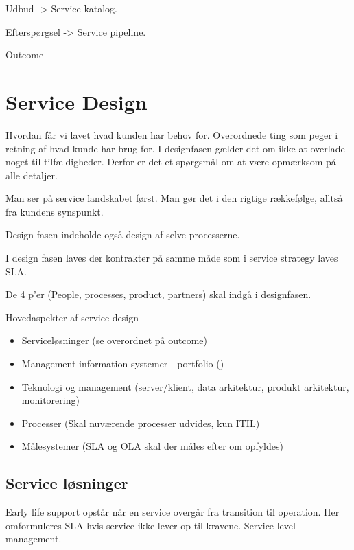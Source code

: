 Udbud -> Service katalog.

Efterspørgsel -> Service pipeline.

Outcome


\section{Service Design}
Hvordan får vi lavet hvad kunden har behov for. Overordnede ting som peger i retning af hvad kunde har brug for. I designfasen gælder det om ikke at overlade noget til tilfældigheder. Derfor er det et spørgsmål om at være opmærksom på alle detaljer.

Man ser på service landskabet først. Man gør det i den rigtige rækkefølge, alltså fra kundens synspunkt.

Design fasen indeholde også design af selve processerne.

I design fasen laves der kontrakter på samme måde som i service strategy laves SLA.

De 4 p'er (People, processes, product, partners) skal indgå i designfasen.

Hovedaspekter af service design

\begin{itemize}
\item Serviceløsninger (se overordnet på outcome)
\item Management information systemer - portfolio ()
\item Teknologi og management (server/klient, data arkitektur, produkt arkitektur, monitorering)
\item Processer (Skal nuværende processer udvides, kun ITIL)
\item Målesystemer (SLA og OLA skal der måles efter om opfyldes)
\end{itemize}

\subsection{Service løsninger}
Early life support opstår når en service overgår fra transition til operation. Her omformuleres SLA hvis service ikke lever op til kravene. Service level management.


























